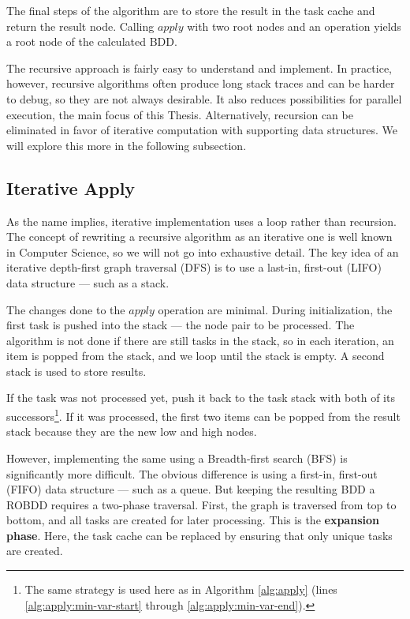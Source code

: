 The final steps of the algorithm are to store the result in the task cache and return the result node. Calling
$apply$ with two root nodes and an operation yields a root node of the calculated BDD.

The recursive approach is fairly easy to understand and implement. In practice, however, recursive algorithms often
produce long stack traces and can be harder to debug, so they are not always desirable. It also reduces possibilities
for parallel execution, the main focus of this Thesis. Alternatively, recursion can be eliminated in favor of
iterative computation with supporting data structures. We will explore this more in the following subsection.

\subsection{Iterative Apply}
\label{chap:bdd:apply:iterative}

As the name implies, iterative implementation uses a loop rather than recursion. The concept of rewriting a recursive
algorithm as an iterative one is well known in Computer Science, so we will not go into exhaustive detail. The key
idea of an iterative depth-first graph traversal (DFS) is to use a last-in, first-out (LIFO) data structure --- such
as a stack.

The changes done to the $apply$ operation are minimal. During initialization, the first task is pushed into the stack
--- the node pair to be processed. The algorithm is not done if there are still tasks in the stack, so in each
iteration, an item is popped from the stack, and we loop until the stack is empty. A second stack is used to store
results.

If the task was not processed yet, push it back to the task stack with both of its successors\footnote{The same
strategy is used here as in Algorithm \ref{alg:apply} (lines \ref{alg:apply:min-var-start} through
\ref{alg:apply:min-var-end}).}. If it was processed, the first two items can be popped from the result stack because
they are the new low and high nodes.

However, implementing the same using a Breadth-first search (BFS) is significantly more difficult. The obvious
difference is using a first-in, first-out (FIFO) data structure --- such as a queue. But keeping the resulting BDD a
ROBDD requires a two-phase traversal. First, the graph is traversed from top to bottom, and all tasks are created for
later processing. This is the \textbf{expansion phase}. Here, the task cache can be replaced by ensuring that only
unique tasks are created.

